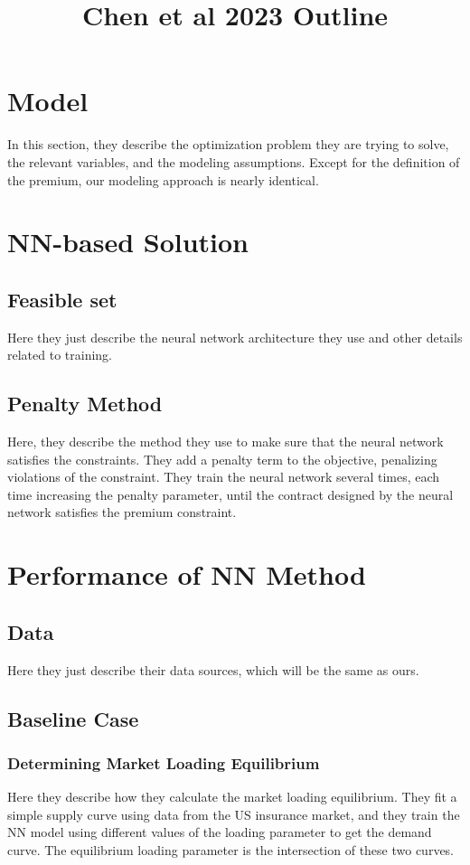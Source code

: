 \documentclass[11pt]{article}
\title{Chen et al 2023 Outline}
\begin{document}
\maketitle

\section{Model}
  In this section, they describe the optimization problem they are trying to solve, the relevant variables, and the modeling assumptions. Except for the definition of the premium, our modeling approach is nearly identical. 
\section{NN-based Solution}
  \subsection{Feasible set}
    Here they just describe the neural network architecture they use and other details related to training. 
  \subsection{Penalty Method}
    Here, they describe the method they use to make sure that the neural network satisfies the constraints. They add a penalty term to the objective, penalizing violations of the constraint. They train the neural network several times, each time increasing the penalty parameter, until the contract designed by the neural network satisfies the premium constraint. 

\section{Performance of NN Method}
  \subsection{Data}
    Here they just describe their data sources, which will be the same as ours. 
  \subsection{Baseline Case}
    \subsubsection{Determining Market Loading Equilibrium}
      Here they describe how they calculate the market loading equilibrium. They fit a simple supply curve using data from the US insurance market, and they train the NN model using different values of the loading parameter to get the demand curve. The equilibrium loading parameter is the intersection of these two curves. 
\end{document}
